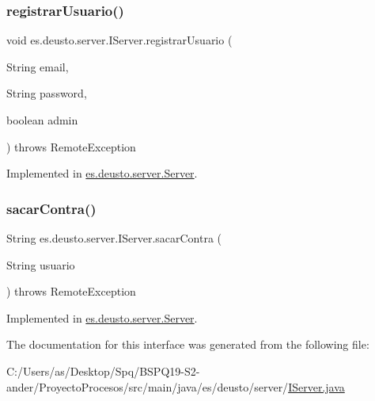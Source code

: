\subsubsection{\texorpdfstring{registrarUsuario()}{registrarUsuario()}}
{\footnotesize\ttfamily void es.\+deusto.\+server.\+I\+Server.\+registrar\+Usuario (\begin{DoxyParamCaption}\item[{String}]{email,  }\item[{String}]{password,  }\item[{boolean}]{admin }\end{DoxyParamCaption}) throws Remote\+Exception}



Implemented in \mbox{\hyperlink{classes_1_1deusto_1_1server_1_1_server_a0f79b8db6904facdae94410e26bef452}{es.\+deusto.\+server.\+Server}}.

\mbox{\label{interfacees_1_1deusto_1_1server_1_1_i_server_a950b819a4f67edf0ef76221dd4714d47}} 
\subsubsection{\texorpdfstring{sacarContra()}{sacarContra()}}
{\footnotesize\ttfamily String es.\+deusto.\+server.\+I\+Server.\+sacar\+Contra (\begin{DoxyParamCaption}\item[{String}]{usuario }\end{DoxyParamCaption}) throws Remote\+Exception}



Implemented in \mbox{\hyperlink{classes_1_1deusto_1_1server_1_1_server_aefe051d880626950ea2964d89a4ae3c3}{es.\+deusto.\+server.\+Server}}.



The documentation for this interface was generated from the following file\+:\begin{DoxyCompactItemize}
\item 
C\+:/\+Users/as/\+Desktop/\+Spq/\+B\+S\+P\+Q19-\/\+S2-\/ander/\+Proyecto\+Procesos/src/main/java/es/deusto/server/\mbox{\hyperlink{_i_server_8java}{I\+Server.\+java}}\end{DoxyCompactItemize}
